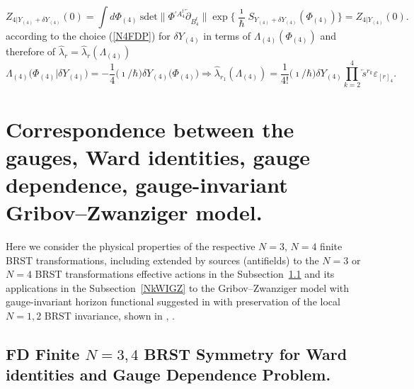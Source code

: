 \documentclass[10pt]{article}
\begin{document}
\begin{equation}\label{N4GI}
  {Z}_{4|Y_{(4)}+\delta Y_{(4)}}(0) =  \int  d {\Phi}_{(4)} \  \mathrm{sdet}\|{\Phi}{}^{\prime A^t_4} \overleftarrow{\partial}_{B^t_4} \| \exp \Big\{\frac{\imath}{\hbar}S_{Y_{(4)}+\delta Y_{(4)}}({\Phi}_{(4)})\Big\}=   Z_{4|Y_{(4)}}(0).
\end{equation}
according to the choice (\ref{N4FDP})   for $\delta Y_{(4)}$ in terms of $\Lambda_{(4)} ({\Phi}_{(4)})$ and therefore of  $\hat{\lambda}_r = \hat{\lambda}_r(\Lambda_{(4)})$
\begin{equation}\label{N4FDPder}
 \Lambda_{(4)} \big({\Phi}_{(4)}|\delta Y_{(4)}\big) =  -\frac{1}{4}\big(\imath / \hbar\big) \delta Y_{(4)}\big({\Phi}_{(4)}\big)   \Longrightarrow \hat{\lambda}_{r_1}(\Lambda_{(4)}) =   \frac{1}{4!}\big(\imath / \hbar\big) \delta Y_{(4)}  \prod_{k=2}^4\overleftarrow{s}{}^{r_k} \varepsilon_{[r]_4}.
\end{equation}



\section{Correspondence between the gauges, Ward identities, gauge dependence,
gauge-invariant Gribov--Zwanziger model.}
\label{NkWI}
 \setcounter{equation}{0}

Here we consider the physical properties of the respective $N=3$, $N=4$ finite BRST transformations, including  extended by sources (antifields) to the $N=3$ or $N=4 $ BRST transformations effective actions
  in the Subsection~\ref{NkWI1} and its applications in the Subsection~\ref{NkWIGZ} to the  Gribov--Zwanziger model \cite{Zwanziger} with gauge-invariant  horizon functional suggested in \cite{Pereira} with preservation of the local $N=1,2$ BRST invariance, shown in \cite{mr}, \cite{reshmosh}.

\subsection{FD Finite $N=3,4$ BRST Symmetry  for  Ward identities and Gauge Dependence Problem.}

\label{NkWI1}
\end{document}
